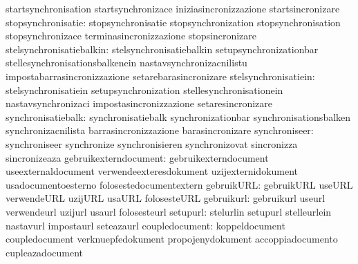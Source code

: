                                   startsynchronisation             startsynchronizace
                                  iniziasincronizzazione           startsincronizare
              stopsynchronisatie: stopsynchronisatie               stopsynchronization
                                  stopsynchronisation              stopsynchronizace
                                  terminasincronizzazione          stopsincronizare
        stelsynchronisatiebalkin: stelsynchronisatiebalkin         setupsynchronizationbar
                                  stellesynchronisationsbalkenein  nastavsynchronizacnilistu
                                  impostabarrasincronizzazione     setarebarasincronizare
            stelsynchronisatiein: stelsynchronisatiein             setupsynchronization
                                  stellesynchronisationein         nastavsynchronizaci
                                  impostasincronizzazione          setaresincronizare
              synchronisatiebalk: synchronisatiebalk               synchronizationbar
                                  synchronisationsbalken           synchronizacnilista
                                  barrasincronizzazione            barasincronizare
                   synchroniseer: synchroniseer                    synchronize
                                  synchronisieren                  synchronizovat
                                  sincronizza                      sincronizeaza
           gebruikexterndocument: gebruikexterndocument            useexternaldocument
                                  verwendeexteresdokument          uzijexternidokument
                                  usadocumentoesterno              folosestedocumentextern
                      gebruikURL: gebruikURL                       useURL
                                  verwendeURL                      uzijURL
                                  usaURL                           folosesteURL
                      gebruikurl: gebruikurl                       useurl
                                  verwendeurl                      uzijurl
                                  usaurl                           folosesteurl
                        setupurl: stelurlin                        setupurl
                                  stelleurlein                     nastavurl
                                  impostaurl                       seteazaurl
                  coupledocument: koppeldocument                   coupledocument
                                  verknuepfedokument               propojenydokument
                                  accoppiadocumento                cupleazadocument

